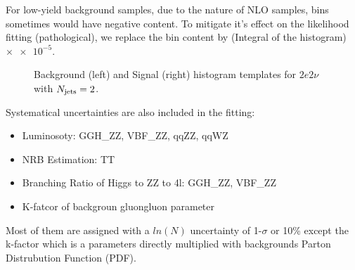 For low-yield background samples, due to the nature of NLO samples, bins sometimes would have negative
content. To mitigate it's effect on the likelihood fitting (pathological), we replace the bin content
by (Integral of the histogram) $\times \num{e-5}$.
\begin{figure}[htb]
    \begin{center}
    \end{center}
    \caption{Background (left) and Signal (right) histogram templates for $2e2\nu$ with $N_\mathrm{jets} = 2$.}
    \label{fig:templates_demo}
\end{figure}

Systematical uncertainties are also included in the fitting:
\begin{itemize}
    \item Luminosoty: GGH\_ZZ, VBF\_ZZ, qqZZ, qqWZ
    \item NRB Estimation: TT
    \item Branching Ratio of Higgs to ZZ to 4l: GGH\_ZZ, VBF\_ZZ
    \item K-fatcor of backgroun gluongluon parameter
\end{itemize}
Most of them are assigned with a $ln(N)$ uncertainty of 1-$\sigma$ or 10\% except the k-factor
which is a parameters directly multiplied with backgrounds Parton Distrubution Function (PDF).
